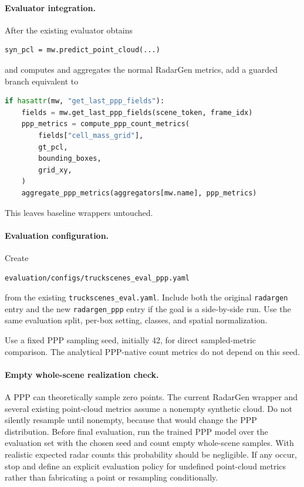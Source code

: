 \documentclass[11pt,a4paper]{article}
\begin{document}
\paragraph{Evaluator integration.}
After the existing evaluator obtains
\begin{lstlisting}
syn_pcl = mw.predict_point_cloud(...)
\end{lstlisting}
and computes and aggregates the normal RadarGen metrics, add a guarded branch equivalent to
\begin{lstlisting}[language=Python]
if hasattr(mw, "get_last_ppp_fields"):
    fields = mw.get_last_ppp_fields(scene_token, frame_idx)
    ppp_metrics = compute_ppp_count_metrics(
        fields["cell_mass_grid"],
        gt_pcl,
        bounding_boxes,
        grid_xy,
    )
    aggregate_ppp_metrics(aggregators[mw.name], ppp_metrics)
\end{lstlisting}

This leaves baseline wrappers untouched.

\paragraph{Evaluation configuration.}
Create
\begin{lstlisting}
evaluation/configs/truckscenes_eval_ppp.yaml
\end{lstlisting}
from the existing \texttt{truckscenes\_eval.yaml}. Include both the original \texttt{radargen} entry and the new \texttt{radargen\_ppp} entry if the goal is a side-by-side run. Use the same evaluation split, per-box setting, classes, and spatial normalization.

Use a fixed PPP sampling seed, initially 42, for direct sampled-metric comparison. The analytical PPP-native count metrics do not depend on this seed.

\paragraph{Empty whole-scene realization check.}
A PPP can theoretically sample zero points. The current RadarGen wrapper and several existing point-cloud metrics assume a nonempty synthetic cloud. Do not silently resample until nonempty, because that would change the PPP distribution. Before final evaluation, run the trained PPP model over the evaluation set with the chosen seed and count empty whole-scene samples. With realistic expected radar counts this probability should be negligible. If any occur, stop and define an explicit evaluation policy for undefined point-cloud metrics rather than fabricating a point or resampling conditionally.
\end{document}
